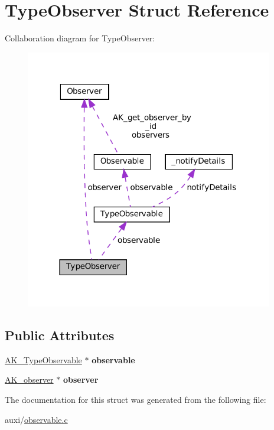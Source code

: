 \hypertarget{structTypeObserver}{}\section{Type\+Observer Struct Reference}
\label{structTypeObserver}


Collaboration diagram for Type\+Observer\+:\nopagebreak
\begin{figure}[H]
\begin{center}
\leavevmode
\includegraphics[width=306pt]{structTypeObserver__coll__graph}
\end{center}
\end{figure}
\subsection*{Public Attributes}
\begin{DoxyCompactItemize}
\item 
\mbox{\label{structTypeObserver_ab85dcdd5b067cbd3b3d35e700949995a}} 
\hyperlink{structTypeObservable}{A\+K\+\_\+\+Type\+Observable} $\ast$ {\bfseries observable}
\item 
\mbox{\label{structTypeObserver_a1cb10ae879b94d66bc013086a3561731}} 
\hyperlink{structObserver}{A\+K\+\_\+observer} $\ast$ {\bfseries observer}
\end{DoxyCompactItemize}


The documentation for this struct was generated from the following file\+:\begin{DoxyCompactItemize}
\item 
auxi/\hyperlink{observable_8c}{observable.\+c}\end{DoxyCompactItemize}
